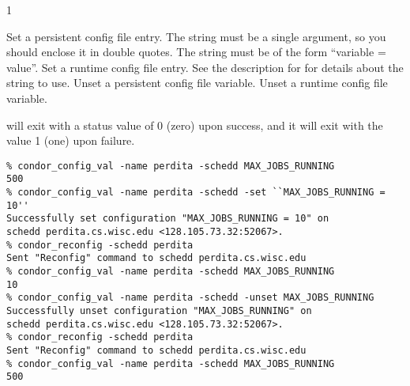 \begin{ManPage}{\label{man-condor-config-val}}{1}
\begin{Options}
	 { Set a persistent
	config file entry.
	The string must be a single argument, so you should enclose it
	in double quotes.
	The string must be of the form ``variable = value''. }
	 { Set a runtime
	config file entry.
	See the description for  for details about the
	string to use. } 
	 { Unset a persistent
	config file variable. }
	 { Unset a runtime
	config file variable. }
\end{Options}

\ExitStatus

 will exit with a status value of 0 (zero) upon success,
and it will exit with the value 1 (one) upon failure.

\Examples

\begin{verbatim}
% condor_config_val -name perdita -schedd MAX_JOBS_RUNNING
500
% condor_config_val -name perdita -schedd -set ``MAX_JOBS_RUNNING = 10''
Successfully set configuration "MAX_JOBS_RUNNING = 10" on 
schedd perdita.cs.wisc.edu <128.105.73.32:52067>.
% condor_reconfig -schedd perdita
Sent "Reconfig" command to schedd perdita.cs.wisc.edu
% condor_config_val -name perdita -schedd MAX_JOBS_RUNNING
10
% condor_config_val -name perdita -schedd -unset MAX_JOBS_RUNNING
Successfully unset configuration "MAX_JOBS_RUNNING" on 
schedd perdita.cs.wisc.edu <128.105.73.32:52067>.
% condor_reconfig -schedd perdita
Sent "Reconfig" command to schedd perdita.cs.wisc.edu
% condor_config_val -name perdita -schedd MAX_JOBS_RUNNING
500
\end{verbatim}

\end{ManPage}
